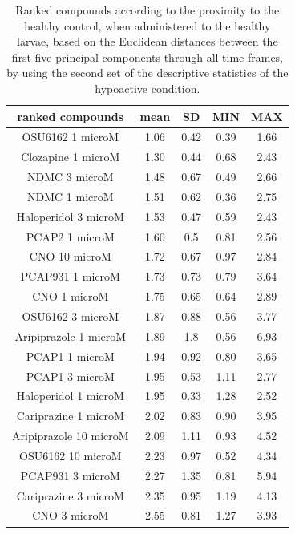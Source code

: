 \begin{table}[h!]\tiny
\centering
\caption{Ranked compounds according to the proximity to the healthy control, when administered to the healthy larvae, based on the Euclidean distances between the first five principal components through all time frames, by using the second set of the descriptive statistics of the hypoactive condition.}
\begin{tabular}{|c|c|c|c|c|}
\hline
ranked compounds             & mean & SD   & MIN  & MAX   \\ \hline
OSU6162 1 microM       & 1.06 & 0.42 & 0.39 & 1.66  \\ \hline
Clozapine 1 microM     & 1.30  & 0.44 & 0.68 & 2.43  \\ \hline
NDMC 3 microM          & 1.48 & 0.67 & 0.49 & 2.66  \\ \hline
NDMC 1 microM          & 1.51 & 0.62 & 0.36 & 2.75  \\ \hline
Haloperidol 3 microM   & 1.53 & 0.47 & 0.59 & 2.43  \\ \hline
PCAP2 1 microM         & 1.60  & 0.5  & 0.81 & 2.56  \\ \hline
CNO 10 microM          & 1.72 & 0.67 & 0.97 & 2.84  \\ \hline
PCAP931 1 microM       & 1.73 & 0.73 & 0.79 & 3.64  \\ \hline
CNO 1 microM           & 1.75 & 0.65 & 0.64 & 2.89  \\ \hline
OSU6162 3 microM       & 1.87 & 0.88 & 0.56 & 3.77  \\ \hline
Aripiprazole 1 microM  & 1.89 & 1.8  & 0.56 & 6.93  \\ \hline
PCAP1 1 microM         & 1.94 & 0.92 & 0.80  & 3.65  \\ \hline
PCAP1 3 microM         & 1.95 & 0.53 & 1.11 & 2.77  \\ \hline
Haloperidol 1 microM   & 1.95 & 0.33 & 1.28 & 2.52  \\ \hline
Cariprazine 1 microM   & 2.02 & 0.83 & 0.90  & 3.95  \\ \hline
Aripiprazole 10 microM & 2.09 & 1.11 & 0.93 & 4.52  \\ \hline
OSU6162 10 microM      & 2.23 & 0.97 & 0.52 & 4.34  \\ \hline
PCAP931 3 microM       & 2.27 & 1.35 & 0.81 & 5.94  \\ \hline
Cariprazine 3 microM   & 2.35 & 0.95 & 1.19 & 4.13  \\ \hline
CNO 3 microM           & 2.55 & 0.81 & 1.27 & 3.93  \\ \hline

\end{tabular}
\end{table}
